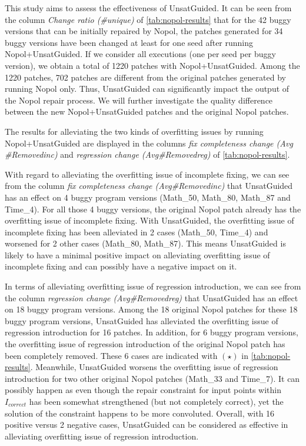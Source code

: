 

This study aims to assess the effectiveness of UnsatGuided. 
It can be seen from the column \emph{Change ratio (\#unique)} of \autoref{tab:nopol-results} that for the 42 buggy versions that can be initially repaired by Nopol, the patches generated for 34 buggy versions have been changed at least for one seed after running Nopol+UnsatGuided. 
If we consider all executions (one per seed per buggy version), we obtain a total of 1220 patches with Nopol+UnsatGuided. 
Among the 1220 patches, 702 patches are different from the original patches generated by running Nopol only. 
Thus, UnsatGuided can significantly impact the output of the Nopol repair process. 
We will further investigate the quality difference between the new Nopol+UnsatGuided patches and the original Nopol patches. 

The results for alleviating the two kinds of overfitting issues by running Nopol+UnsatGuided are displayed in the columns \emph{fix completeness change (Avg \#Removedinc)} and \emph{regression change (Avg\#Removedreg)} of \autoref{tab:nopol-results}.

With regard to alleviating the overfitting issue of incomplete fixing, we can see from the column \emph{fix completeness change (Avg\#Removedinc)} that UnsatGuided has an effect on 4 buggy program versions (Math\_50, Math\_80, Math\_87 and Time\_4). 
For all those 4 buggy versions, the original Nopol patch already has the overfitting issue of incomplete fixing. 
With UnsatGuided, the overfitting issue of incomplete fixing has been alleviated in 2 cases (Math\_50, Time\_4) and worsened for 2 other cases (Math\_80, Math\_87). 
This means UnsatGuided is likely to have a minimal positive impact on alleviating overfitting issue of incomplete fixing and can possibly have a negative impact on it.

In terms of alleviating overfitting issue of regression introduction, we can see from the column \emph{regression change (Avg\#Removedreg)} that UnsatGuided has an effect on 18 buggy program versions. 
Among the 18 original Nopol patches for these 18 buggy program versions, UnsatGuided has alleviated the overfitting issue of regression introduction for 16 patches. 
In addition, for 6 buggy program versions, the overfitting issue of regression introduction of the original Nopol patch has been completely removed.  
These 6 cases are indicated with $(\star)$ in \autoref{tab:nopol-results}. 
Meanwhile, UnsatGuided worsens the overfitting issue of regression introduction for two other original Nopol patches (Math\_33 and Time\_7). 
It can possibly happen as even though the repair constraint for input points within $I_{correct}$ has been somewhat strengthened (but not completely correct), yet the solution of the constraint happens to be more convoluted.
Overall, with 16 positive versus 2 negative cases, UnsatGuided can be considered as effective in alleviating overfitting issue of regression introduction. 


